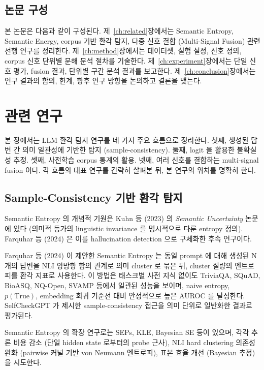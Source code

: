 \documentclass[oneside,ko,under]{snuthesis}
\begin{document}
\section{논문 구성}

본 논문은 다음과 같이 구성된다. 제~\ref{ch:related}장에서는 Semantic Entropy, Semantic Energy, corpus 기반 환각 탐지, 다중 신호 결합 (Multi-Signal Fusion) 관련 선행 연구를 정리한다. 제~\ref{ch:method}장에서는 데이터셋, 실험 설정, 신호 정의, corpus 신호 단위별 분해 분석 절차를 기술한다. 제~\ref{ch:experiment}장에서는 단일 신호 평가, fusion 결과, 단위별 구간 분석 결과를 보고한다. 제~\ref{ch:conclusion}장에서는 연구 결과의 함의, 한계, 향후 연구 방향을 논의하고 결론을 맺는다.


\chapter{관련 연구}{\label{ch:related}}

본 장에서는 LLM 환각 탐지 연구를 네 가지 주요 흐름으로 정리한다. 첫째, 생성된 답변 간 의미 일관성에 기반한 탐지 (sample-consistency). 둘째, logit 을 활용한 불확실성 추정. 셋째, 사전학습 corpus 통계의 활용. 넷째, 여러 신호를 결합하는 multi-signal fusion 이다. 각 흐름의 대표 연구를 간략히 살펴본 뒤, 본 연구의 위치를 명확히 한다.

\section{Sample-Consistency 기반 환각 탐지}

Semantic Entropy 의 개념적 기원은 Kuhn 등 (2023)\cite{kuhn2023semantic} 의 \emph{Semantic Uncertainty} 논문에 있다 (의미적 등가의 linguistic invariance 를 명시적으로 다룬 entropy 정의). Farquhar 등 (2024)\cite{farquhar2024} 은 이를 hallucination detection 으로 구체화한 후속 연구이다.

Farquhar 등 (2024)\cite{farquhar2024} 이 제안한 Semantic Entropy 는 동일 prompt 에 대해 생성된 N 개의 답변을 NLI 양방향 함의 관계로 의미 cluster 로 묶은 뒤, cluster 질량의 엔트로피를 환각 지표로 사용한다. 이 방법은 태스크별 사전 지식 없이도 TriviaQA, SQuAD, BioASQ, NQ-Open, SVAMP 등에서 일관된 성능을 보이며, naive entropy, $p(\text{True})$, embedding 회귀 기준선 대비 안정적으로 높은 AUROC 를 달성한다. SelfCheckGPT\cite{selfcheckgpt2023} 가 제시한 sample-consistency 접근을 의미 단위로 일반화한 결과로 평가된다.

Semantic Entropy 의 확장 연구로는 SEPs\cite{kossen2024seprobes}, KLE\cite{nikitin2024kle}, Bayesian SE\cite{ciosek2025bayes} 등이 있으며, 각각 추론 비용 감소 (단일 hidden state 로부터의 probe 근사), NLI hard clustering 의존성 완화 (pairwise 커널 기반 von Neumann 엔트로피), 표본 효율 개선 (Bayesian 추정) 을 시도한다.
\end{document}
